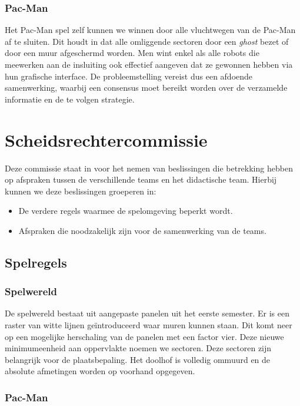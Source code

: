 \documentclass[12pt,a4paper]{report}
\begin{document}
\subsection{Pac-Man}

Het Pac-Man spel zelf kunnen we winnen door alle vluchtwegen van de Pac-Man af te sluiten. Dit houdt in dat alle omliggende sectoren door een \emph{ghost} bezet of door een muur afgeschermd worden. Men wint enkel als alle robots die meewerken aan de insluiting ook effectief aangeven dat ze gewonnen hebben via hun grafische interface. De probleemstelling vereist dus een afdoende samenwerking, waarbij een consensus moet bereikt worden over de verzamelde informatie en de te volgen strategie.

\chapter{Scheidsrechtercommissie}

Deze commissie staat in voor het nemen van beslissingen die betrekking hebben op afspraken tussen de verschillende teams en het didactische team. Hierbij kunnen we deze beslissingen groeperen in:

\begin{itemize}
	\item De verdere regels waarmee de spelomgeving beperkt wordt.
	\item Afspraken die noodzakelijk zijn voor de samenwerking van de teams.
\end{itemize}

\section{Spelregels}

\subsection{Spelwereld}

De spelwereld bestaat uit aangepaste panelen uit het eerste semester. Er is een raster van witte lijnen ge\"introduceerd waar muren kunnen staan. Dit komt neer op een mogelijke herschaling van de panelen met een factor vier. Deze nieuwe minimumeenheid aan oppervlakte noemen we sectoren. Deze sectoren zijn belangrijk voor de plaatsbepaling. Het doolhof is volledig ommuurd en de absolute afmetingen worden op voorhand opgegeven.

\subsection{Pac-Man}
\end{document}
